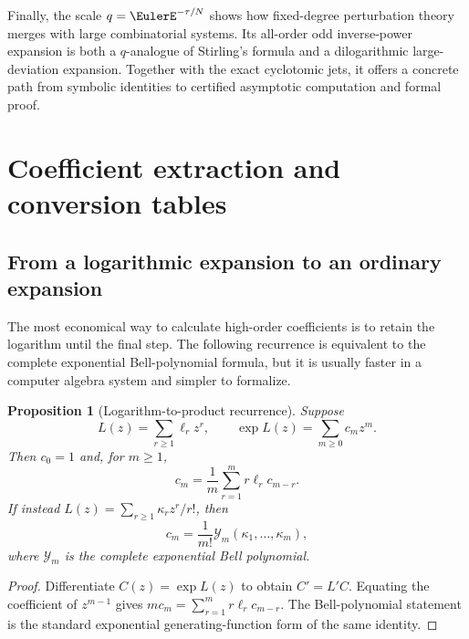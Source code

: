 \documentclass[11pt,oneside]{article}
\newtheorem{proposition}[theorem]{Proposition}
\theoremstyle{definition}
\theoremstyle{remark}
\newcommand{\Bell}{\mathcal Y}
\let\reporttopsection\section
\let\reportsubsection\subsection
\let\chapter\reporttopsection
\let\section\reportsubsection
\begin{document}
Finally, the scale $q=\EulerE^{-\tau/N}$ shows how fixed-degree perturbation theory
merges with large combinatorial systems.  Its all-order odd inverse-power
expansion is both a $q$-analogue of Stirling's formula and a dilogarithmic
large-deviation expansion.  Together with the exact cyclotomic jets, it offers
a concrete path from symbolic identities to certified asymptotic computation
and formal proof.


\appendix
\renewcommand{\theHsection}{appendix.\Alph{section}}
\renewcommand{\theHsubsection}{\theHsection.\arabic{subsection}}
\renewcommand{\theHtheorem}{\theHsection.\arabic{theorem}}

\chapter{Coefficient extraction and conversion tables}\label{app:coefficients}

\section{From a logarithmic expansion to an ordinary expansion}

The most economical way to calculate high-order coefficients is to retain the
logarithm until the final step.  The following recurrence is equivalent to the
complete exponential Bell-polynomial formula, but it is usually faster in a
computer algebra system and simpler to formalize.

\begin{proposition}[Logarithm-to-product recurrence]\label{prop:log-product-recurrence}
Suppose
\[
 L(z)=\sum_{r\ge1}\ell_r z^r,
 \qquad
 \exp L(z)=\sum_{m\ge0}c_mz^m.
\]
Then $c_0=1$ and, for $m\ge1$,
\begin{equation}\label{eq:log-product-recurrence}
 c_m=\frac1m\sum_{r=1}^{m}r\ell_r c_{m-r}.
\end{equation}
If instead
$L(z)=\sum_{r\ge1}\kappa_rz^r/r!$, then
\[
 c_m=\frac1{m!}\Bell_m(\kappa_1,\ldots,\kappa_m),
\]
where $\Bell_m$ is the complete exponential Bell polynomial.
\end{proposition}

\begin{proof}
Differentiate $C(z)=\exp L(z)$ to obtain $C'=L'C$.  Equating the coefficient
of $z^{m-1}$ gives
$m c_m=\sum_{r=1}^{m}r\ell_r c_{m-r}$.  The Bell-polynomial statement is the
standard exponential generating-function form of the same identity.
\end{proof}
\end{document}
